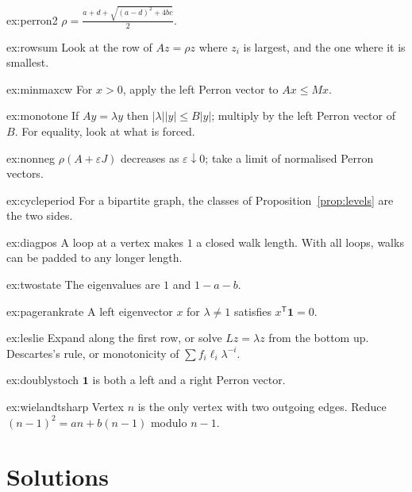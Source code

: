 \begin{hint}{ex:perron2}
$\rho=\frac{a+d+\sqrt{(a-d)^2+4bc}}2$.
\end{hint}
\begin{hint}{ex:rowsum}
Look at the row of $Az=\rho z$ where $z_i$ is largest, and the one where it is smallest.
\end{hint}
\begin{hint}{ex:minmaxcw}
For $x>0$, apply the left Perron vector to $Ax\le Mx$.
\end{hint}
\begin{hint}{ex:monotone}
If $Ay=\lambda y$ then $|\lambda||y|\le B|y|$; multiply by the left Perron vector of $B$. For equality, look at what is forced.
\end{hint}
\begin{hint}{ex:nonneg}
$\rho(A+\varepsilon J)$ decreases as $\varepsilon\downarrow0$; take a limit of normalised Perron vectors.
\end{hint}
\begin{hint}{ex:cycleperiod}
For a bipartite graph, the classes of Proposition~\ref{prop:levels} are the two sides.
\end{hint}
\begin{hint}{ex:diagpos}
A loop at a vertex makes $1$ a closed walk length. With all loops, walks can be padded to any longer length.
\end{hint}
\begin{hint}{ex:twostate}
The eigenvalues are $1$ and $1-a-b$.
\end{hint}
\begin{hint}{ex:pagerankrate}
A left eigenvector $x$ for $\lambda\ne1$ satisfies $x^{\mathsf T}\mathbf 1=0$.
\end{hint}
\begin{hint}{ex:leslie}
Expand along the first row, or solve $Lz=\lambda z$ from the bottom up. Descartes's rule, or monotonicity of $\sum f_i\ell_i
\lambda^{-i}$.
\end{hint}
\begin{hint}{ex:doublystoch}
$\mathbf 1$ is both a left and a right Perron vector.
\end{hint}
\begin{hint}{ex:wielandtsharp}
Vertex $n$ is the only vertex with two outgoing edges. Reduce $(n-1)^2=an+b(n-1)$ modulo $n-1$.
\end{hint}

\section{Solutions}

